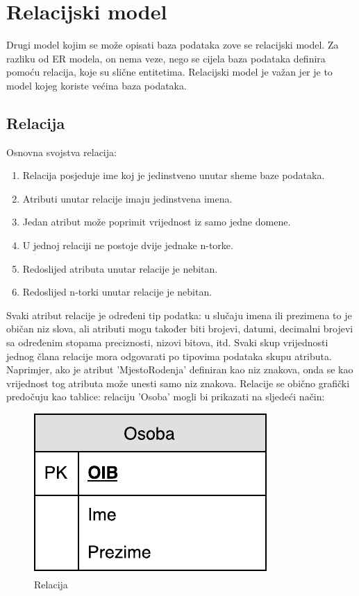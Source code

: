 \documentclass[times, utf8, zavrsni]{fer}
\begin{document}
\clearpage
\section{Relacijski model}

Drugi model kojim se može opisati baza podataka zove se relacijski model. Za razliku od ER modela, on nema veze, nego se cijela baza podataka definira pomoću relacija, koje su slične entitetima. Relacijski model je važan jer je to model kojeg koriste većina baza podataka.

\subsection{Relacija}

Osnovna svojstva relacija:
\begin{enumerate}
\item Relacija posjeduje ime koj je jedinstveno unutar sheme baze podataka.
\item Atributi unutar relacije imaju jedinstvena imena.
\item Jedan atribut može poprimit vrijednost iz samo jedne domene.
\item U jednoj relaciji ne postoje dvije jednake n-torke.
\item Redoslijed atributa unutar relacije je nebitan.
\item Redoslijed n-torki unutar relacije je nebitan.\\
\end{enumerate}

Svaki atribut relacije je određeni tip podatka: u slučaju imena ili prezimena to je običan niz slova, ali atributi mogu također biti brojevi, datumi, decimalni brojevi sa određenim stopama preciznosti, nizovi bitova, itd. Svaki skup vrijednosti jednog člana relacije mora odgovarati po tipovima podataka skupu atributa. Naprimjer, ako je atribut 'MjestoRodenja' definiran kao niz znakova, onda se kao vrijednost tog atributa može unesti samo niz znakova. Relacije se obično grafički predočuju kao tablice: relaciju 'Osoba' mogli bi prikazati na sljedeći način:\\

\begin{figure}[H]
\centering
\includegraphics[scale=0.8]{img/rel-osoba.pdf}
\caption{Relacija}
\label{fig:rel-osoba}
\end{figure}
\end{document}
